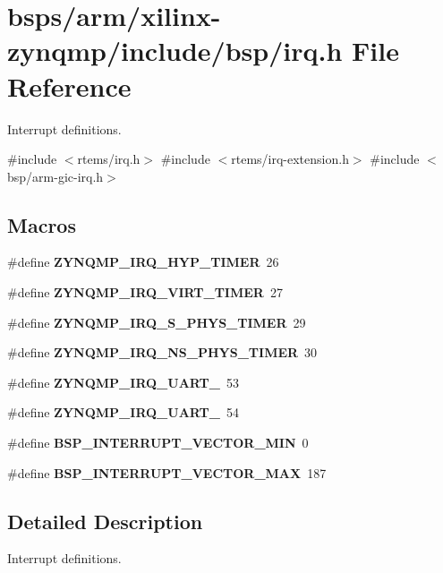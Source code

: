 \hypertarget{bsps_2arm_2xilinx-zynqmp_2include_2bsp_2irq_8h}{}\section{bsps/arm/xilinx-\/zynqmp/include/bsp/irq.h File Reference}
\label{bsps_2arm_2xilinx-zynqmp_2include_2bsp_2irq_8h}


Interrupt definitions.  


{\ttfamily \#include $<$rtems/irq.\+h$>$}\newline
{\ttfamily \#include $<$rtems/irq-\/extension.\+h$>$}\newline
{\ttfamily \#include $<$bsp/arm-\/gic-\/irq.\+h$>$}\newline
\subsection*{Macros}
\begin{DoxyCompactItemize}
\item 
\#define {\bfseries Z\+Y\+N\+Q\+M\+P\+\_\+\+I\+R\+Q\+\_\+\+H\+Y\+P\+\_\+\+T\+I\+M\+ER}~26
\item 
\#define {\bfseries Z\+Y\+N\+Q\+M\+P\+\_\+\+I\+R\+Q\+\_\+\+V\+I\+R\+T\+\_\+\+T\+I\+M\+ER}~27
\item 
\#define {\bfseries Z\+Y\+N\+Q\+M\+P\+\_\+\+I\+R\+Q\+\_\+\+S\+\_\+\+P\+H\+Y\+S\+\_\+\+T\+I\+M\+ER}~29
\item 
\#define {\bfseries Z\+Y\+N\+Q\+M\+P\+\_\+\+I\+R\+Q\+\_\+\+N\+S\+\_\+\+P\+H\+Y\+S\+\_\+\+T\+I\+M\+ER}~30
\item 
\#define {\bfseries Z\+Y\+N\+Q\+M\+P\+\_\+\+I\+R\+Q\+\_\+\+U\+A\+R\+T\+\_}~53
\item 
\#define {\bfseries Z\+Y\+N\+Q\+M\+P\+\_\+\+I\+R\+Q\+\_\+\+U\+A\+R\+T\+\_}~54
\item 
\#define {\bfseries B\+S\+P\+\_\+\+I\+N\+T\+E\+R\+R\+U\+P\+T\+\_\+\+V\+E\+C\+T\+O\+R\+\_\+\+M\+IN}~0
\item 
\#define {\bfseries B\+S\+P\+\_\+\+I\+N\+T\+E\+R\+R\+U\+P\+T\+\_\+\+V\+E\+C\+T\+O\+R\+\_\+\+M\+AX}~187
\end{DoxyCompactItemize}


\subsection{Detailed Description}
Interrupt definitions. 

